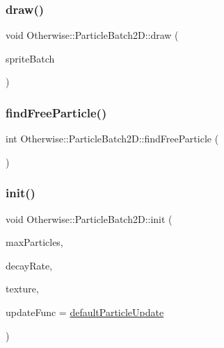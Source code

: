 \subsubsection{\texorpdfstring{draw()}{draw()}}
{\footnotesize\ttfamily void Otherwise\+::\+Particle\+Batch2\+D\+::draw (\begin{DoxyParamCaption}\item[{\hyperlink{class_otherwise_1_1_sprite_batch}{Sprite\+Batch} $\ast$}]{sprite\+Batch }\end{DoxyParamCaption})}

\mbox{\label{class_otherwise_1_1_particle_batch2_d_a1e0cea65acdd2b2b77597dac53af0c73}} 
\subsubsection{\texorpdfstring{find\+Free\+Particle()}{findFreeParticle()}}
{\footnotesize\ttfamily int Otherwise\+::\+Particle\+Batch2\+D\+::find\+Free\+Particle (\begin{DoxyParamCaption}{ }\end{DoxyParamCaption})\hspace{0.3cm}{\ttfamily [private]}}

\mbox{\label{class_otherwise_1_1_particle_batch2_d_ac39cfd55e9baa73573914784f700e28a}} 
\subsubsection{\texorpdfstring{init()}{init()}}
{\footnotesize\ttfamily void Otherwise\+::\+Particle\+Batch2\+D\+::init (\begin{DoxyParamCaption}\item[{int}]{max\+Particles,  }\item[{float}]{decay\+Rate,  }\item[{\hyperlink{struct_otherwise_1_1_g_l_texture}{G\+L\+Texture}}]{texture,  }\item[{std\+::function$<$ void(\hyperlink{class_otherwise_1_1_particle2_d}{Particle2D} \&, float)$>$}]{update\+Func = {\ttfamily \hyperlink{namespace_otherwise_ac7cfb6f643b2ea32aa02502159d17fb6}{default\+Particle\+Update}} }\end{DoxyParamCaption})}

